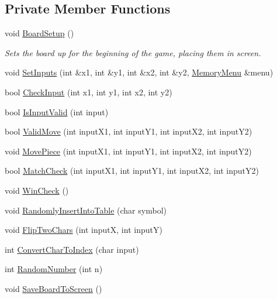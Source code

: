 \subsection*{Private Member Functions}
\begin{DoxyCompactItemize}
\item 
void \hyperlink{classMemoryMatch_a1e3b9172bdd0fb69f0360bb28acee65c}{Board\-Setup} ()
\begin{DoxyCompactList}\small\item\em Sets the board up for the beginning of the game, placing them in screen. \end{DoxyCompactList}\item 
void \hyperlink{classMemoryMatch_afe732c2f2aef27e10742604aa0b6b474}{Set\-Inputs} (int \&x1, int \&y1, int \&x2, int \&y2, \hyperlink{classMemoryMenu}{Memory\-Menu} \&menu)
\item 
bool \hyperlink{classMemoryMatch_a64f64d28f47e59f3303addf70ca136e2}{Check\-Input} (int x1, int y1, int x2, int y2)
\item 
bool \hyperlink{classMemoryMatch_a8d0683346a26c1d00c818e9b75b5a412}{Is\-Input\-Valid} (int input)
\item 
bool \hyperlink{classMemoryMatch_ae5f190c71bc1a63ec95eab6fd8a3c2c7}{Valid\-Move} (int input\-X1, int input\-Y1, int input\-X2, int input\-Y2)
\item 
void \hyperlink{classMemoryMatch_a68e81f3e7ed13385f430da0bc938d7e9}{Move\-Piece} (int input\-X1, int input\-Y1, int input\-X2, int input\-Y2)
\item 
bool \hyperlink{classMemoryMatch_a7a83e4a378bb74a729d495d9a8896248}{Match\-Check} (int input\-X1, int input\-Y1, int input\-X2, int input\-Y2)
\item 
void \hyperlink{classMemoryMatch_a1c958b2c366188c2c603c562b3f2f878}{Win\-Check} ()
\item 
void \hyperlink{classMemoryMatch_a61158d799b281be3607860233899b405}{Randomly\-Insert\-Into\-Table} (char symbol)
\item 
void \hyperlink{classMemoryMatch_a9ea522ae206345fc5a6d730ed7ff4adc}{Flip\-Two\-Chars} (int input\-X, int input\-Y)
\item 
int \hyperlink{classMemoryMatch_ae684d58439ac7d7ca9e6dcd8b1c1f977}{Convert\-Char\-To\-Index} (char input)
\item 
int \hyperlink{classMemoryMatch_a0543038015f3bbd9db9e9a235cf12579}{Random\-Number} (int n)
\item 
void \hyperlink{classMemoryMatch_a6d4c54b56ee4f5b4df36b7767e07ebd5}{Save\-Board\-To\-Screen} ()

\end{DoxyCompactItemize}
